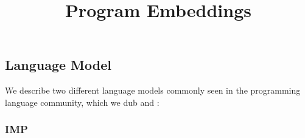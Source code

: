 \documentclass[12pt]{article}
\title{Program Embeddings}
\date{}
\begin{document}
\maketitle

\subsection*{Language Model}
We describe two different language models commonly seen in the
programming language community, which we dub \imp{} and \lamcalc{}:

\subsubsection*{IMP}

\end{document}
